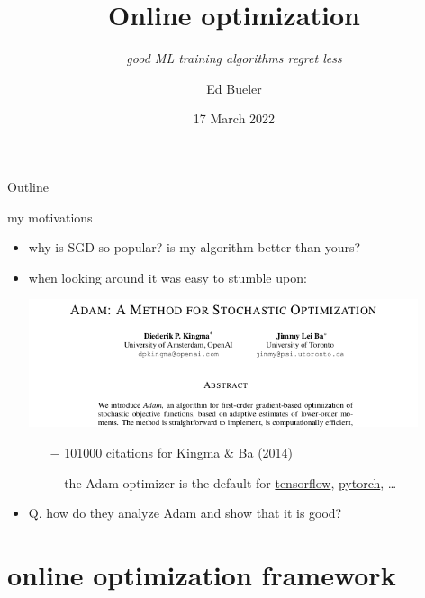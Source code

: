 \documentclass[xcolor={svgnames},
               hyperref={colorlinks,citecolor=DeepPink4,linkcolor=FireBrick,urlcolor=Maroon}]
               {beamer}
\title{Online optimization}
\subtitle{\emph{good ML training algorithms regret less}}
\author{Ed Bueler}
\institute[UAF]{MATH 692 Mathematics for Machine Learning}
\date[]{17 March 2022}
\begin{document}
\beamertemplatenavigationsymbolsempty

\begin{frame}
  \maketitle
\end{frame}


\begin{frame}{Outline}
  \tableofcontents[hideallsubsections]
\end{frame}


\begin{frame}{my motivations}

\begin{itemize}
\item why is SGD so popular? is my algorithm better than yours?

\medskip
\item when looking around it was easy to stumble upon:

\medskip
\begin{center}
\includegraphics[width=0.9\textwidth]{figs/adam-paper.png}
\end{center}

\medskip
    \begin{itemize}
    \item[$-$] 101000 citations for Kingma \& Ba (2014)
    \item[$-$] the Adam optimizer is the default for \href{https://www.tensorflow.org/tutorials/keras/classification}{tensorflow}, \href{https://pytorch.org/docs/stable/optim.html}{pytorch}, \dots
    \end{itemize}

\medskip
\item \alert{Q.} how do they analyze Adam and show that it is good?
\end{itemize}
\end{frame}


\section{online optimization framework}
\end{document}
